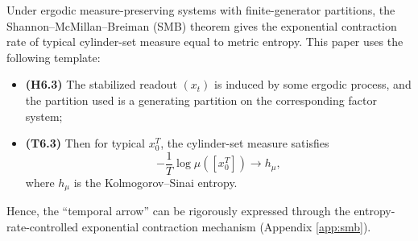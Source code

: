 Under ergodic measure-preserving systems with finite-generator partitions, the Shannon--McMillan--Breiman (SMB) theorem gives the exponential contraction rate of typical cylinder-set measure equal to metric entropy. This paper uses the following template:
\begin{itemize}
  \item \textbf{(H6.3)} The stabilized readout $(x_t)$ is induced by some ergodic process, and the partition used is a generating partition on the corresponding factor system;
  \item \textbf{(T6.3)} Then for typical $x_0^T$, the cylinder-set measure satisfies
  \[
  -\frac{1}{T}\log \mu([x_0^T])\to h_\mu,
  \]
  where $h_\mu$ is the Kolmogorov--Sinai entropy.
\end{itemize}
Hence, the ``temporal arrow'' can be rigorously expressed through the entropy-rate-controlled exponential contraction mechanism (Appendix \ref{app:smb}).
